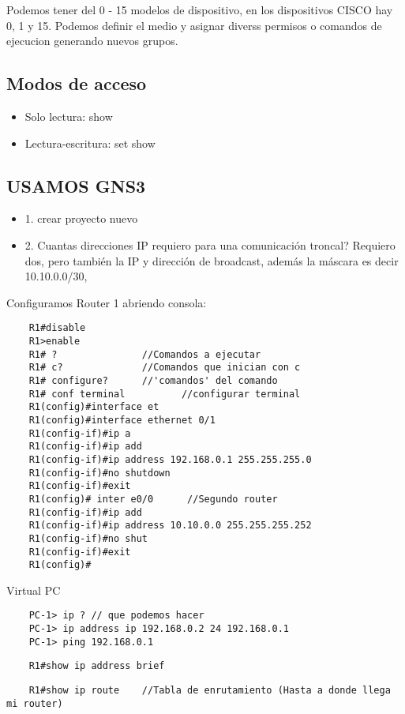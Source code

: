 Podemos tener del 0 - 15 modelos de dispositivo, en los dispositivos CISCO hay 0, 1 y 15. Podemos definir el medio y asignar diverss permisos o comandos de ejecucion generando nuevos grupos.

\subsection{Modos de acceso}
\begin{itemize}
    \item {Solo lectura: show}
    \item {Lectura-escritura: set show}
\end{itemize}

\subsection{USAMOS GNS3}
\begin{itemize}
    \item {1. crear proyecto nuevo}
    \item {2. Cuantas direcciones IP requiero para una comunicación troncal? Requiero dos, pero también la IP y dirección de broadcast, además la máscara es decir 10.10.0.0/30, }
\end{itemize}
Configuramos Router 1 abriendo consola:
\begin{lstlisting}
    R1#disable
    R1>enable 
    R1# ?               //Comandos a ejecutar
    R1# c?              //Comandos que inician con c
    R1# configure?      //'comandos' del comando
    R1# conf terminal          //configurar terminal 
    R1(config)#interface et
    R1(config)#interface ethernet 0/1
    R1(config-if)#ip a
    R1(config-if)#ip add
    R1(config-if)#ip address 192.168.0.1 255.255.255.0
    R1(config-if)#no shutdown
    R1(config-if)#exit 
    R1(config)# inter e0/0      //Segundo router
    R1(config-if)#ip add 
    R1(config-if)#ip address 10.10.0.0 255.255.255.252
    R1(config-if)#no shut 
    R1(config-if)#exit
    R1(config)#
\end{lstlisting}

Virtual PC
\begin{lstlisting}
    PC-1> ip ? // que podemos hacer 
    PC-1> ip address ip 192.168.0.2 24 192.168.0.1
    PC-1> ping 192.168.0.1
\end{lstlisting}

\begin{lstlisting}
    R1#show ip address brief
\end{lstlisting}

\begin{lstlisting}
    R1#show ip route    //Tabla de enrutamiento (Hasta a donde llega mi router)
\end{lstlisting}

